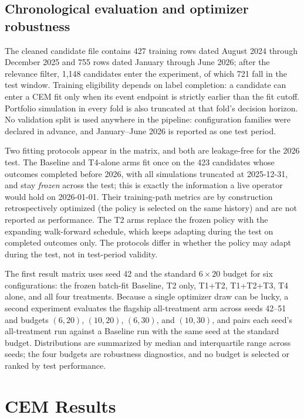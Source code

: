 \documentclass[sigconf,anonymous]{acmart}
\begin{document}
\subsection{Chronological evaluation and optimizer robustness}
\label{sec:chronology}

The cleaned candidate file contains 427 training rows dated August 2024 through December 2025 and 755 rows dated January through June 2026; after the relevance filter, 1,148 candidates enter the experiment, of which 721 fall in the test window. Training eligibility depends on label completion: a candidate can enter a CEM fit only when its event endpoint is strictly earlier than the fit cutoff. Portfolio simulation in every fold is also truncated at that fold's decision horizon. No validation split is used anywhere in the pipeline: configuration families were declared in advance, and January--June 2026 is reported as one test period.

Two fitting protocols appear in the matrix, and both are leakage-free for the 2026 test. The Baseline and T4-alone arms fit once on the 423 candidates whose outcomes completed before 2026, with all simulations truncated at 2025-12-31, and stay \emph{frozen} across the test; this is exactly the information a live operator would hold on 2026-01-01. Their training-path metrics are by construction retrospectively optimized (the policy is selected on the same history) and are not reported as performance. The T2 arms replace the frozen policy with the expanding walk-forward schedule, which keeps adapting during the test on completed outcomes only. The protocols differ in whether the policy may adapt during the test, not in test-period validity.

The first result matrix uses seed 42 and the standard $6\times20$ budget for six configurations: the frozen batch-fit Baseline, T2 only, T1+T2, T1+T2+T3, T4 alone, and all four treatments. Because a single optimizer draw can be lucky, a second experiment evaluates the flagship all-treatment arm across seeds 42--51 and budgets $(6,20)$, $(10,20)$, $(6,30)$, and $(10,30)$, and pairs each seed's all-treatment run against a Baseline run with the same seed at the standard budget. Distributions are summarized by median and interquartile range across seeds; the four budgets are robustness diagnostics, and no budget is selected or ranked by test performance.

\section{CEM Results}
\end{document}
